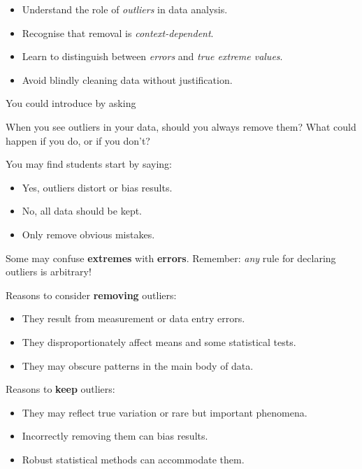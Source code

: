 \documentclass[
  11pt,
  a4paper,
  krantz2]{krantz}
\makeatletter
\providecommand{\tightlist}{%
  \setlength{\itemsep}{0pt}\setlength{\parskip}{0pt}}
\renewenvironment{quote}%
{\begin{kframe}}
{\end{kframe}}
\newenvironment{kframe}{%
\medskip{}
\setlength{\fboxsep}{.8em}
 \def\at@end@of@kframe{}%
 \ifinner\ifhmode%
  \def\at@end@of@kframe{\end{minipage}}%
  \begin{minipage}{\columnwidth}%
 \fi\fi%
 \def\FrameCommand##1{\hskip\@totalleftmargin \hskip-\fboxsep
 \colorbox{shadecolor}{##1}\hskip-\fboxsep
     \hskip-\linewidth \hskip-\@totalleftmargin \hskip\columnwidth}%
 \MakeFramed {\advance\hsize-\width
   \@totalleftmargin\z@ \linewidth\hsize
   \@setminipage}}%
 {\par\unskip\endMakeFramed%
 \at@end@of@kframe}
\renewenvironment{quote}
               {\list{}{\vspace{-0.5em}\begin{kframe}\small%
                        \rightmargin   \leftmargin
                        \parsep        \z@ \@plus\p@}%
                \item\relax}
               {\end{kframe}\endlist}
\makeatother
\begin{document}
\begin{itemize}
\tightlist
\item
  Understand the role of \emph{outliers} in data analysis.
\item
  Recognise that removal is \emph{context-dependent}.
\item
  Learn to distinguish between \emph{errors} and \emph{true extreme values}.
\item
  Avoid blindly cleaning data without justification.
\end{itemize}

You could introduce by asking

\begin{quote}
When you see outliers in your data, should you always remove them?
What could happen if you do, or if you don't?
\end{quote}

You may find students start by saying:

\begin{itemize}
\tightlist
\item
  Yes, outliers distort or bias results.
\item
  No, all data should be kept.
\item
  Only remove obvious mistakes.
\end{itemize}

Some may confuse \textbf{extremes} with \textbf{errors}.
Remember: \emph{any} rule for declaring outliers is arbitrary!

Reasons to consider \textbf{removing} outliers:

\begin{itemize}
\tightlist
\item
  They result from measurement or data entry errors.
\item
  They disproportionately affect means and some statistical tests.
\item
  They may obscure patterns in the main body of data.
\end{itemize}

Reasons to \textbf{keep} outliers:

\begin{itemize}
\tightlist
\item
  They may reflect true variation or rare but important phenomena.
\item
  Incorrectly removing them can bias results.
\item
  Robust statistical methods can accommodate them.
\end{itemize}
\end{document}
